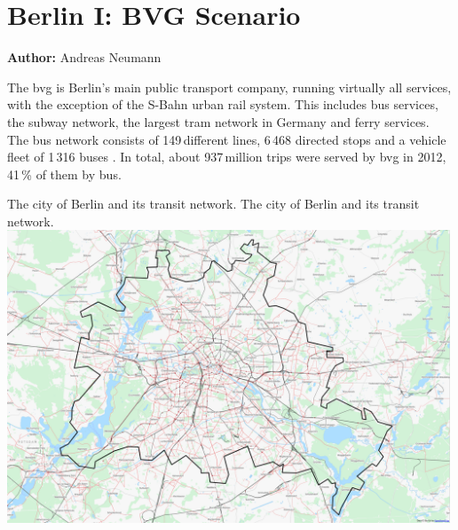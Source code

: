 \section{Berlin I: BVG Scenario}
\label{sec:berlinI}
\hfill \textbf{Author:} Andreas Neumann


The \gls{bvg} is Berlin's main public transport company, running virtually all services, with the exception of the S-Bahn urban rail system. This includes bus services, the subway network, the largest tram network in Germany and ferry services. The bus network consists of 149\,different lines, 6\,468 directed stops and a vehicle fleet of 1\,316 buses \citep{BVG2012}. In total, about 937\,million trips were served by \gls{bvg} in 2012, 41\,\% of them by bus.

\createfigure%
{The city of Berlin and its transit network.}%
{The city of Berlin and its transit network.}%
{\label{fig:scenario_berlin_i}}%
{\includegraphics[width=0.99\textwidth, angle=0]{using/figures/berlin_pt}}%
{}

